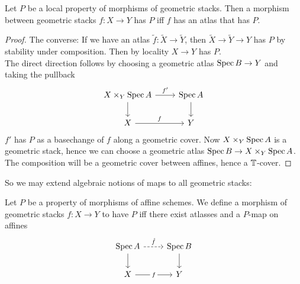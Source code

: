 \documentclass{article}
\begin{document}
\begin{lemma}
    Let $P$ be a local property of morphisms of geometric stacks. Then a morphism between geometric stacks $f : X \to Y$ has $P$ iff $f$ has an atlas that has $P$.
\end{lemma}
\begin{proof}
	The converse: If we have an atlas $\tilde f : \tilde X \to \tilde Y$, then $\tilde X \to \tilde Y \to Y$ has $P$ by stability under composition. Then by locality $X \to Y$ has $P$. \\
	The direct direction follows by choosing a geometric atlas $\operatorname{Spec} B \to Y$ and taking the pullback %
	\[\begin{tikzcd}
		{X \times_Y \Spec A} & {\Spec A} \\
		X & Y
		\arrow["{f'}", from=1-1, to=1-2]
		\arrow[from=1-1, to=2-1]
		\arrow[from=1-2, to=2-2]
		\arrow["f", from=2-1, to=2-2]
	\end{tikzcd}\]
$f'$ has $P$ as a basechange of $f$ along a geometric cover. Now $X \times_Y \operatorname{Spec} A$ is a geometric stack, hence we can choose a geometric atlas $\operatorname{Spec} B \to X \times_Y \operatorname{Spec} A$. The composition will be a geometric cover between affines, hence a $\mathbb{T}$-cover.
\end{proof}

So we may extend algebraic notions of maps to all geometric stacks:
\begin{definition}
	Let $P$ be a property of morphisms of affine schemes. We define a morphism of geometric stacks $f : X \to Y$ to have $P$ iff
	there exist atlasses and a $P$-map on affines 
	\[\begin{tikzcd}
		{\Spec A} & {\Spec B} \\
		X & Y
		\arrow["{\hat f}", dashed, from=1-1, to=1-2]
		\arrow[from=1-1, to=2-1]
		\arrow[from=1-2, to=2-2]
		\arrow["f"{description}, from=2-1, to=2-2]
	\end{tikzcd}\]
\end{definition}
\end{document}
